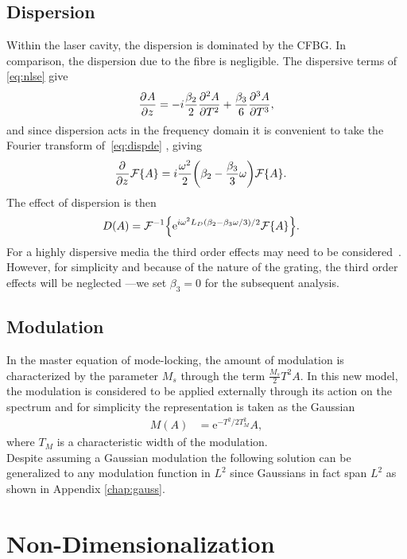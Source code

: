 \subsection{Dispersion}
Within the laser cavity, the dispersion is dominated by the CFBG. In comparison, the dispersion due to the fibre is negligible. The dispersive terms of \eqref{eq:nlse} give
\begin{align}
\label{eq:dispde}
	\pdiff{A}{z} = -i \frac{\beta_2}{2} \pdiff[2]{A}{T} + \frac{\beta_3}{6} \pdiff[3]{A}{T},
\end{align}
and since dispersion acts in the frequency domain it is convenient to take the Fourier transform of~\eqref{eq:dispde} \cite{debnath, gradshteyn}, giving
\begin{align*}
	\pdiff{}{z}\FT{A} &= i\frac{\omega^2}{2}\left(\beta_2 - \frac{\beta_3}{3} \omega\right) \FT{A}.
\end{align*}
The effect of dispersion is then
\begin{align*}
D(A) &= \FTi{\textrm{e}^{i \omega^2 L_D(\beta_2 - \beta_3 \omega/3)/2} \FT{A}}.
\end{align*}
For a highly dispersive media the third order effects may need to be considered~\cite{agrawal2013, litchinitser}. However, for simplicity and because of the nature of the grating, the third order effects will be neglected \cite{agrawal2013, ferreira}---we set $\beta_3=0$ for the subsequent analysis.

\subsection{Modulation}
In the master equation of mode-locking, the amount of modulation is characterized by the parameter $M_s$ through the term $\frac{M_s}{2}T^2 A$. In this new model, the modulation is considered to be applied externally through its action on the spectrum and for simplicity the representation is taken as the Gaussian
\begin{align*}
M(A) &= \textrm{e}^{-T^2 / 2 T_M^2} A,
\end{align*}
where $T_M$ is a characteristic width of the modulation. \\

Despite assuming a Gaussian modulation the following solution can be generalized to any modulation function in $L^2$ since Gaussians in fact span $L^2$ as shown in Appendix \ref{chap:gauss}. \\

\section{Non-Dimensionalization}

